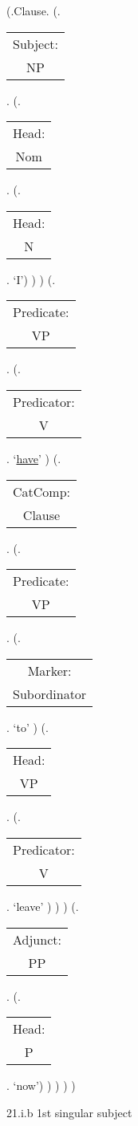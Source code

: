 \documentclass[12pt,letterpaper]{article}
\begin{document}
\begin{figure}
	\begin{center}
		\begin{parsetree}
			(.Clause.
			(.\begin{tabular}{c}Subject:\\NP\end{tabular}.  
			(.\begin{tabular}{c}Head:\\Nom\end{tabular}.
			(.\begin{tabular}{c}Head:\\N\end{tabular}. `I')
			)
			)
			(.\begin{tabular}{c}Predicate:\\VP\end{tabular}.
			(.\begin{tabular}{c}Predicator:\\V\end{tabular}.    `\underline{have}' )
			(.\begin{tabular}{c}CatComp:\\Clause\end{tabular}. 
			(.\begin{tabular}{c}Predicate:\\VP\end{tabular}.
			(.\begin{tabular}{c}Marker:\\Subordinator\end{tabular}.    `to' )
			(.\begin{tabular}{c}Head:\\VP\end{tabular}.
			(.\begin{tabular}{c}Predicator:\\V\end{tabular}.    `leave' )
			)
			)
			(.\begin{tabular}{c}Adjunct:\\PP\end{tabular}. 
			(.\begin{tabular}{c}Head:\\P\end{tabular}. `now')
			)
			)
			)
			)
			
		\end{parsetree}
		\hfill \break \hfill \break
		21.i.b 1st singular subject
	\end{center}
\end{figure}
\end{document}
